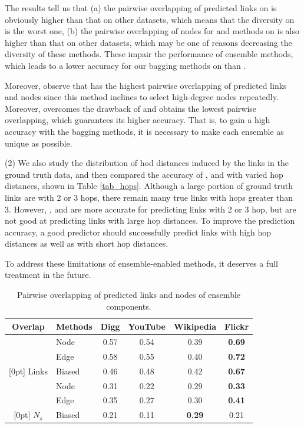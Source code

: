 The results tell us that (a) the pairwise overlapping of predicted links on \Flickr is
obviously higher than that on other datasets, which means that the diversity on \Flickr is the
worst one, (b) the pairwise overlapping of nodes for
\Node and \Edge methods on \Flickr is also higher than that on other datasets, which may be
one of reasons decreasing the diversity of these methods. These impair the performance of ensemble methods,
which leads to a lower accuracy for our bagging methods on \Flickr than \NMF.

Moreover, observe that \Edge has the highest
pairwise overlapping of predicted links and nodes since this method inclines to select high-degree
nodes repeatedly. Moreover, \Biased overcomes the drawback of \Edge and obtains the lowest pairwise
overlapping, which guarantees its higher accuracy. That is, to gain a high accuracy with the bagging methods, it
is necessary to make each ensemble as unique as possible.


\sstab(2) We also study the distribution of hod distances induced by the links in the ground truth data,
and then compared the accuracy of \BIGCLAM, \NMF and \Biased with varied hop distances, shown in Table \ref{tab_hops}.
Although a large portion of ground truth links are with 2 or 3 hops, there remain many true links with hops greater than 3.
However, \BIGCLAM, \NMF and \Biased are more accurate for predicting links with 2 or 3 hop,  but are not good at predicting
links with large hop distances. To improve the prediction accuracy, a good predictor should successfully predict
links with high hop distances as well as with short hop distances.

To address these limitations of ensemble-enabled methods, it deserves a full treatment in the future.



\begin{table}
\caption{Pairwise overlapping of predicted links and nodes of ensemble components.}
\label{tab_limitations}
\vspace{-2ex}
\centering
\newcommand{\tabincell}[2]{\begin{tabular}{@{}#1@{}}#2\end{tabular}}
\begin{tabular}{c|l|c|c|c|c}
\hline \hline Overlap & Methods & Digg & YouTube & Wikipedia & Flickr \\
\hline \hline
& Node & 0.57 & 0.54 & 0.39 & \textbf{0.69} \\
& Edge & 0.58 & 0.55 & 0.40 & \textbf{0.72} \\
\raisebox{2.5ex}[0pt]{ Links } & Biased & 0.46 & 0.48 & 0.42 & \textbf{0.67} \\
\hline
& Node & 0.31 & 0.22 & 0.29 & \textbf{0.33} \\
& Edge & 0.35 & 0.27 & 0.30 & \textbf{0.41} \\
\raisebox{2.5ex}[0pt]{ $N_s$ } & Biased & 0.21 & 0.11 & \textbf{0.29} & 0.21 \\
\hline \hline
\end{tabular}
\vspace{-2ex}
\end{table}



